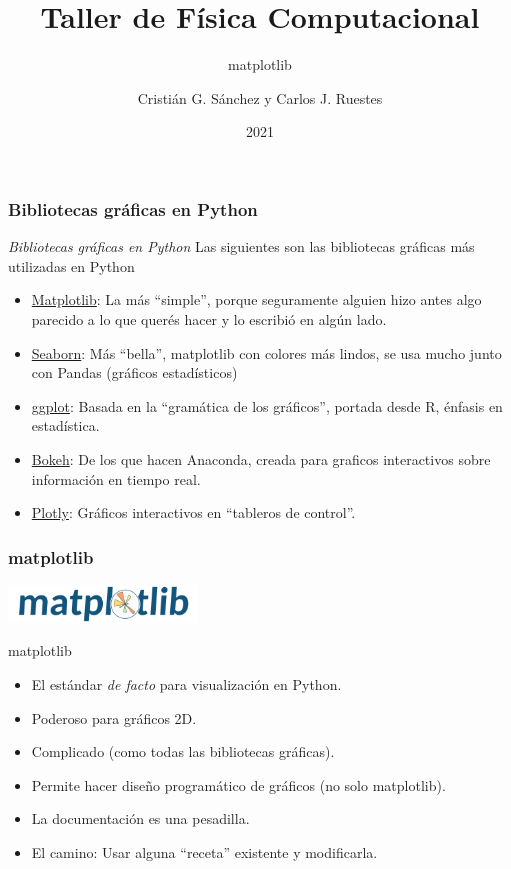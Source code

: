 \documentclass{beamer}
\title{Taller de Física Computacional}
\subtitle{matplotlib}
\author{Cristián G. Sánchez y Carlos J. Ruestes}
\date{2021}
\begin{document}
\frame{\titlepage}


\begin{frame}[fragile]
    \frametitle{Bibliotecas gráficas en Python}
    \begin{block}{{\em Bibliotecas gráficas en Python}}
        Las siguientes son las bibliotecas gráficas más utilizadas en Python
    \begin{itemize}
    \item \href{https://matplotlib.org}{Matplotlib}: La más ``simple'', porque seguramente alguien hizo antes algo parecido a lo que querés hacer y lo escribió en algún lado.
    \item \href{http://seaborn.pydata.org}{Seaborn}: Más ``bella'', matplotlib con colores más lindos, se usa mucho junto con Pandas (gráficos estadísticos)
    \item \href{http://ggplot.yhathq.com}{ggplot}: Basada en la ``gramática de los gráficos'', portada desde R, énfasis en estadística.
    \item \href{https://docs.bokeh.org/en/latest/}{Bokeh}: De los que hacen Anaconda, creada para graficos interactivos sobre información en tiempo real.
    \item \href{https://plotly.com}{Plotly}: Gráficos interactivos en ``tableros de control''.
    \end{itemize}
\end{block}    
\end{frame}

\begin{frame}[fragile]
    \frametitle{matplotlib}
    \includegraphics[width=5cm]{figuras/matplotlib.png}
    \begin{block}{matplotlib}
        \begin{itemize}
            \item El estándar {\em de facto} para visualización en Python.
            \item Poderoso para gráficos 2D.
            \item Complicado (como todas las bibliotecas gráficas).
            \item Permite hacer diseño programático de gráficos (no solo matplotlib).
            \item La documentación es una pesadilla.
            \item El camino: Usar alguna ``receta'' existente y modificarla.
        \end{itemize}
    \end{block}
    \end{frame}
\end{document}

